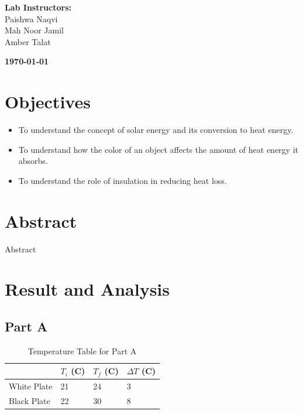 \documentclass[a4paper, 12pt, english]{article}
\begin{document}
\begin{titlepage}
\begin{center}
		\vspace{45pt}
		\textbf {\large Lab Instructors:}\\[0.2cm]
		\Large {Paishwa Naqvi}\\[0.1cm]
		\Large {Mah Noor Jamil}\\[0.1cm]
		\Large {Amber Talat}\\[0.1cm]
	\end{center}

	\par
	\vfill
	\begin{center}
		\textbf{\today}\\
	\end{center}

\end{titlepage}



\newpage
\section{Objectives}
\begin{itemize}
	\item To understand the concept of solar energy and its conversion to heat energy.
	\item To understand how the color of an object affects the amount of heat energy it
	      absorbs.
	\item To understand the role of insulation in reducing heat loss.
\end{itemize}

\section{Abstract}
Abstract

\section{Result and Analysis}
\subsection{Part A}
\begin{table}[H]
	\centering
	\caption{Temperature Table for Part A}
	\label{tab:table1}
	\begin{tabular}{@{}llll@{}}
		\toprule
		            & \textbf{$T_i$ (\degree C)} & \textbf{$T_f$ (\degree C)} & \textbf{$\Delta T$ (\degree C)} \\ \midrule
		White Plate & 21                         & 24                         & 3                               \\
		Black Plate & 22                         & 30                         & 8                               \\ \bottomrule
	\end{tabular}
\end{table}
\end{document}
